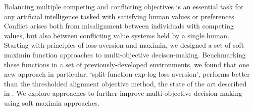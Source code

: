 
Balancing multiple competing and conflicting objectives is an essential task for any artificial intelligence tasked with satisfying human values or preferences. Conflict arises both from misalignment between individuals with competing values, but also between conflicting value systems held by a single human. Starting with principles of loss-aversion and maximin, we designed a set of soft maximin function approaches to multi-objective decison-making. Benchmarking these functions in a set of previously-developed environments, we found that one new approach in particular, `split-function exp-log loss aversion', performs better than the thresholded alignment objective method, the state of the art described in \cite{vamplew_potential-based_2021}. We explore approaches to further improve multi-objective decision-making using soft maximin approaches.

